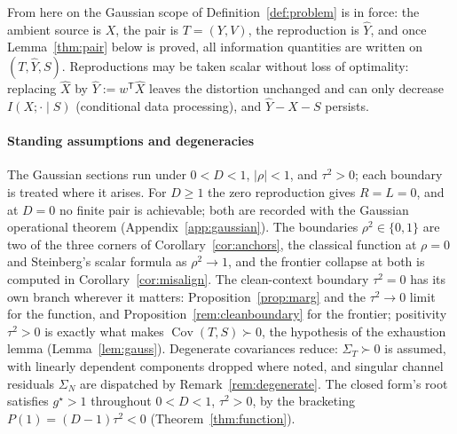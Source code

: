 \documentclass[11pt,onecolumn]{IEEEtran}
\newcommand{\Cov}{\operatorname{Cov}}
\newcommand{\hX}{\widehat{X}}
\newcommand{\hY}{\widehat{Y}}
\begin{document}
From here on the Gaussian scope of Definition~\ref{def:problem} is in
force: the ambient source is $X$, the pair is $T=(Y,V)$, the reproduction
is $\hY$, and once Lemma~\ref{thm:pair} below is proved, all
information quantities are written on $(T,\hY,S)$. Reproductions may be
taken scalar without loss of optimality: replacing
$\hX$ by $\hY:=w^{\mathsf T}\hX$ leaves the distortion unchanged and can
only decrease $I(X;\cdot\mid S)$ (conditional data processing), and
$\hY-X-S$ persists.

\paragraph*{Standing assumptions and degeneracies}
The Gaussian sections run under $0<D<1$, $|\rho|<1$, and $\tau^2>0$;
each boundary is treated where it arises.
For $D\ge1$ the zero reproduction gives $R=L=0$, and at $D=0$ no finite
pair is achievable; both are recorded with the Gaussian operational
theorem (Appendix~\ref{app:gaussian}). The boundaries $\rho^2\in\{0,1\}$
are two of the three corners of Corollary~\ref{cor:anchors}, the
classical function at $\rho=0$ and Steinberg's scalar formula as
$\rho^2\to1$, and the frontier collapse at both is computed in
Corollary~\ref{cor:misalign}. The clean-context boundary
$\tau^2=0$ has its own branch wherever it matters:
Proposition~\ref{prop:marg} and the $\tau^2\to0$ limit for the
function, and Proposition~\ref{rem:cleanboundary} for the frontier; positivity
$\tau^2>0$ is exactly what makes $\Cov(T,S)\succ0$, the hypothesis of
the exhaustion lemma (Lemma~\ref{lem:gauss}). Degenerate covariances
reduce: $\Sigma_T\succ0$ is assumed, with linearly dependent components
dropped where noted, and singular channel residuals $\Sigma_N$ are
dispatched by Remark~\ref{rem:degenerate}. The closed form's root satisfies
$g^\star>1$ throughout $0<D<1$, $\tau^2>0$, by the bracketing
$P(1)=(D-1)\tau^2<0$ (Theorem~\ref{thm:function}).
\end{document}
